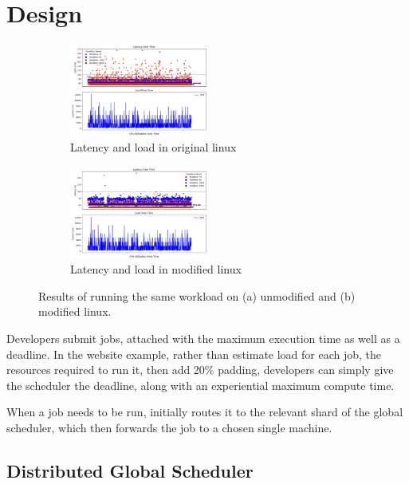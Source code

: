 \section{Design}

\begin{figure}[ht!]
    \centering
    \begin{subfigure}[t]{0.5\textwidth}
        \centering
        \includegraphics[height=1.2in]{img/old_lnx__2ms_wait__10K_iter.png}
        \caption{Latency and load in original linux}
    \end{subfigure}%
    \hfill
    \begin{subfigure}[t]{0.5\textwidth}
        \centering
        \includegraphics[height=1.2in]{img/new_lnx__2ms_wait__10K_iter.png}
        \caption{Latency and load in modified linux}
        \label{fig:graph:new}
    \end{subfigure}
    \vspace{10pt}
    \caption{Results of running the same workload on (a) unmodified and (b) modified linux.}
    \label{fig:graph}
\end{figure}

Developers submit jobs, attached with the maximum execution time as well as a
deadline. In the website example, rather than estimate load for each job, the
resources required to run it, then add 20\% padding, developers can simply give
the scheduler the deadline, along with an experiential maximum compute time.

When a job needs to be run, \sysname{} initially routes it to the relevant shard
of the global scheduler, which then forwards the job to a chosen single machine. 


\subsection*{Distributed Global Scheduler}

